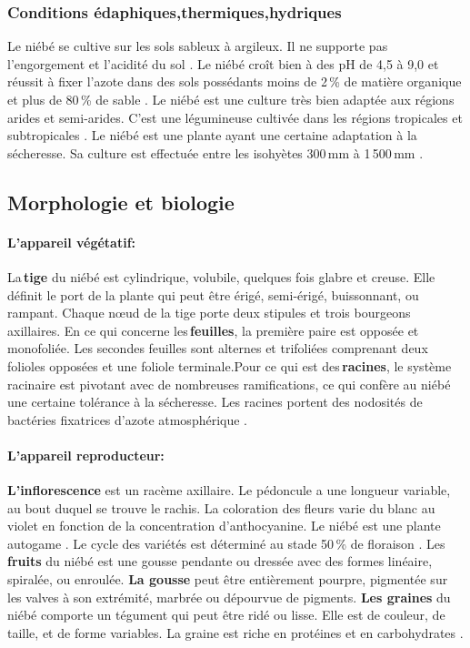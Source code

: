 \documentclass[a4paper,11pt]{article}
\begin{document}
\subsubsection{Conditions édaphiques,thermiques,hydriques}

Le niébé se cultive sur les sols sableux à argileux. Il ne supporte
pas l'engorgement et l'acidité du sol \cite{Doggett_1988}. Le niébé
croît bien à des pH de 4,5 à 9,0 et réussit à fixer l'azote dans des
sols possédants moins de 2\,\% de matière organique et plus de 80\,\% de
sable \cite{SINGH_1997}. Le niébé est une culture très bien adaptée
aux régions arides et semi-arides. C'est une légumineuse cultivée
dans les régions tropicales et subtropicales \cite{Doggett_1988}. Le
niébé est une plante ayant une certaine adaptation à la
sécheresse. Sa culture est effectuée entre les isohyètes 300\,mm à
1\,500\,mm \cite{Doggett_1988}.

\subsection{Morphologie et biologie}


\paragraph{L'appareil végétatif:}

La\,\textbf{tige} du niébé est cylindrique, volubile, quelques fois
glabre et creuse. Elle définit le port de la plante qui peut être
érigé, semi-érigé, buissonnant, ou rampant. Chaque nœud de la tige
porte deux stipules et trois bourgeons axillaires. En ce qui concerne
les\,\textbf{feuilles}, la première paire est opposée et
monofoliée. Les secondes feuilles sont alternes et trifoliées
comprenant deux folioles opposées et une foliole terminale.Pour ce qui
est des\,\textbf{racines}, le système racinaire est pivotant avec de
nombreuses ramifications, ce qui confère au niébé une certaine
tolérance à la sécheresse. Les racines portent des nodosités de
bactéries fixatrices d'azote atmosphérique \cite{Doggett_1988}.



\paragraph{L'appareil reproducteur:}

\textbf{L'inflorescence} est un racème axillaire. Le pédoncule a une
longueur variable, au bout duquel se trouve le rachis. La coloration
des fleurs varie du blanc au violet en fonction de la concentration
d'anthocyanine. Le niébé est une plante autogame \cite{Fery}. Le cycle
des variétés est déterminé au stade 50\,\% de floraison
\cite{Drabo_1981}. Les\,\textbf{fruits} du niébé est une gousse
pendante ou dressée avec des formes linéaire, spiralée, ou
enroulée. \textbf{La gousse} peut être entièrement pourpre, pigmentée
sur les valves à son extrémité, marbrée ou dépourvue de
pigments. \textbf{Les graines} du niébé comporte un tégument qui peut
être ridé ou lisse. Elle est de couleur, de taille, et de forme
variables. La graine est riche en protéines et en carbohydrates
\cite{Doggett_1988}.
\end{document}
